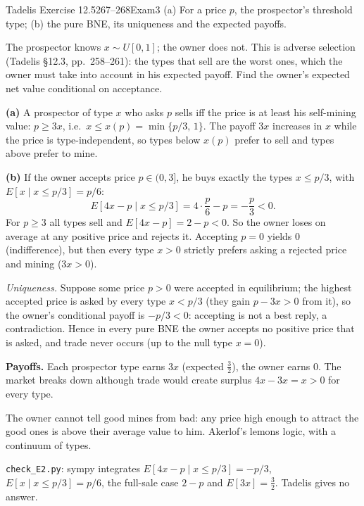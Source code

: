 \begin{exsol}{Tadelis Exercise 12.5}{267--268}{Exam}{3}
\asked (a) For a price $p$, the prospector's threshold type; (b) the pure BNE, its uniqueness and
the expected payoffs.

\method The prospector knows $x\sim U[0,1]$; the owner does not. This is adverse selection
(Tadelis \S12.3, pp.~258--261): the types that sell are the worst ones, which the owner must
take into account in his expected payoff. Find the owner's expected net value conditional on
acceptance.

\solution
\textbf{(a)} A prospector of type $x$ who asks $p$ sells iff the price is at least his
self-mining value: $p\ge3x$, i.e.\ $x\le x(p)=\min\{p/3,\,1\}$. The payoff $3x$ increases
in $x$ while the price is type-independent, so types below $x(p)$ prefer to sell and types above prefer to mine.

\textbf{(b)} If the owner accepts price $p\in(0,3]$, he buys exactly the types $x\le p/3$, with
$E[x\mid x\le p/3]=p/6$:
\[
  E[4x-p\mid x\le p/3]=4\cdot\frac p6-p=-\frac p3<0 .
\]
For $p\ge3$ all types sell and $E[4x-p]=2-p<0$. So the owner loses on average at any positive
price and rejects it. Accepting $p=0$ yields $0$ (indifference), but then every type $x>0$
strictly prefers asking a rejected price and mining ($3x>0$).

\emph{Uniqueness.} Suppose some price $p>0$ were accepted in equilibrium; the highest accepted
price is asked by every type $x<p/3$ (they gain $p-3x>0$ from it), so the owner's conditional
payoff is $-p/3<0$: accepting is not a best reply, a contradiction. Hence in every pure BNE the
owner accepts no positive price that is asked, and trade never occurs (up to the null type $x=0$).

\textbf{Payoffs.} Each prospector type earns $3x$ (expected $\tfrac32$), the owner earns $0$.
The market breaks down although trade would create surplus $4x-3x=x>0$ for every type.

\interp The owner cannot tell good mines from bad: any price high enough to attract the good
ones is above their average value to him. Akerlof's lemons logic, with a continuum of types.

\verify \texttt{check\_E2.py}: sympy integrates $E[4x-p\mid x\le p/3]=-p/3$, $E[x\mid x\le p/3]=p/6$,
the full-sale case $2-p$ and $E[3x]=\tfrac32$. Tadelis gives no answer.

\end{exsol}
